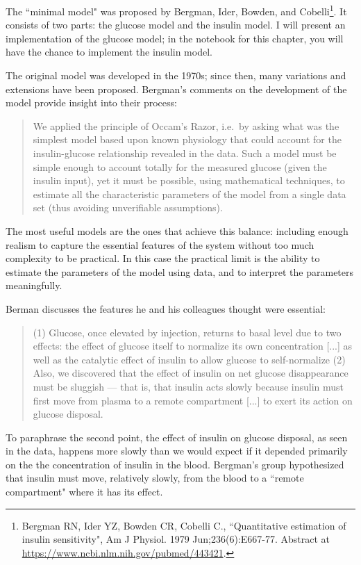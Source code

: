 \documentclass[12pt]{book}
\theoremstyle{exercise}
\begin{document}
The ``minimal model" was proposed by Bergman, Ider, Bowden, and Cobelli\footnote{Bergman RN, Ider YZ, Bowden CR, Cobelli C., ``Quantitative estimation of insulin sensitivity", Am J Physiol. 1979 Jun;236(6):E667-77.  Abstract at \url{https://www.ncbi.nlm.nih.gov/pubmed/443421}.}.
It consists of two parts: the glucose model and the insulin model.  I will present an implementation of the glucose model; in the notebook for this chapter, you will have the chance to implement the insulin model.

The original model was developed in the 1970s; since then, many variations and extensions have been proposed.  Bergman's comments on the development of the model provide insight into their process:

\begin{quote}
We applied the principle of Occam's Razor, i.e.~by asking
what was the simplest model based upon known physiology
that could account for the insulin-glucose relationship
revealed in the data. Such a model must be simple
enough to account totally for the measured glucose (given
the insulin input), yet it must be possible, using mathematical
techniques, to estimate all the characteristic parameters
of the model from a single data set (thus avoiding
unverifiable assumptions).
\end{quote}

The most useful models are the ones that achieve this balance: including enough realism to capture the essential features of the system without too much complexity to be practical.  In this case the practical limit is the ability to estimate the parameters of the model using data, and to interpret the parameters meaningfully.

Berman discusses the features he and his colleagues thought were essential:

\begin{quote}
(1) Glucose, once elevated by injection, returns to basal level due to
two effects: the effect of glucose itself to normalize its own
concentration [...] as well as the catalytic effect of insulin to allow
glucose to self-normalize (2) Also, we discovered
that the effect of insulin on net glucose disappearance
must be sluggish --- that is, that insulin acts slowly because
insulin must first move from plasma to a remote compartment [...] to exert its action on glucose disposal.
\end{quote}

To paraphrase the second point, the effect of insulin on glucose disposal, as seen in the data, happens more slowly than we would expect if it depended primarily on the the concentration of insulin in the blood.  Bergman's group hypothesized that insulin must move, relatively slowly, from the blood to a ``remote compartment" where it has its effect.
\end{document}
